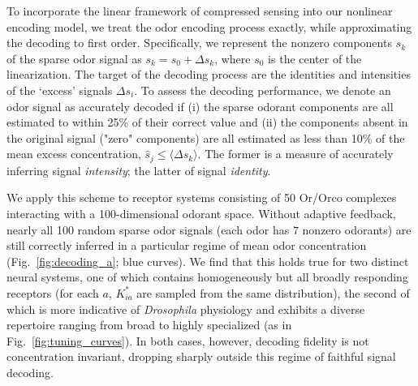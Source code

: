 \begin{figure}[!tb]
	\label{fig:decoding}
\end{figure}

To incorporate the linear framework of compressed sensing into our nonlinear encoding model, we treat the odor encoding process exactly, while approximating the decoding to first order. %
Specifically, we represent the nonzero components $s_k$ of the sparse odor signal as $s_k = s_0 + \Delta s_k$, where $s_0$ is the center of the linearization. The target of the decoding process are the identities and intensities of the `excess' signals $\Delta s_i$. 
To assess the decoding performance, we denote an odor signal as accurately decoded if (i) the sparse odorant components are all estimated to within 25\% of their correct value and (ii) the components absent in the original signal ("zero" components) are all estimated as less than 10\% of the mean excess concentration, $\hat s_j \le \langle \Delta s_k \rangle$. The former is a measure of accurately inferring signal \textit{intensity}; the latter of signal \textit{identity}. 

We apply this scheme to receptor systems consisting of 50 Or/Orco complexes interacting with a 100-dimensional odorant space. Without adaptive feedback, nearly all 100 random sparse odor signals (each odor has $7$ nonzero odorants) are still correctly inferred in a particular regime of mean odor concentration (Fig.~\ref{fig:decoding_a}; blue curves). We find that this holds true for two distinct neural systems, one of which contains homogeneously but all broadly responding receptors (for each $a$, $K^*_{ia}$ are sampled from the same distribution), the second of which is more indicative of \textit{Drosophila} physiology and exhibits a diverse repertoire ranging from broad to highly specialized (as in Fig.~\ref{fig:tuning_curves}). In both cases, however, decoding fidelity is not concentration invariant, dropping sharply outside this regime of faithful signal decoding.

